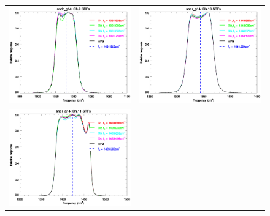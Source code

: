 \begin{figure}[htp]
\begin{tabular}{c c}
    \includegraphics[scale=0.5]{graphics/nominal/sndr_g14.ch9.srf.eps} &
    \includegraphics[scale=0.5]{graphics/nominal/sndr_g14.ch10.srf.eps} \\
    \includegraphics[scale=0.5]{graphics/nominal/sndr_g14.ch11.srf.eps} &

\end{tabular}
\end{figure}
